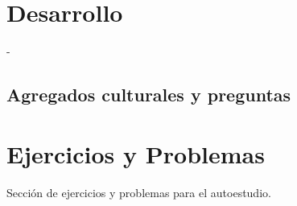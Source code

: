 \section{Desarrollo}




-



\subsection{Agregados culturales y preguntas}




\section{Ejercicios y Problemas}

Sección de ejercicios y problemas para el autoestudio.
